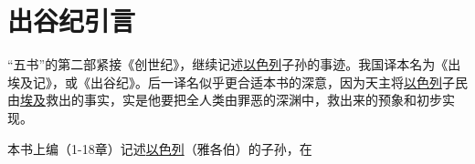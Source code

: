 \chapter{出谷纪引言}

“五书”的第二部紧接《创世纪》，继续记述\uline{以色列}子孙的事迹。我国译本名为《出埃及记》，或《出谷纪》。后一译名似乎更合适本书的深意，因为天主将\uline{以色列}子民由\uline{埃及}救出的事实，实是他要把全人类由罪恶的深渊中，救出来的预象和初步实现。

本书上编（1-18章）记述\uline{以色列}（雅各伯）的子孙，在